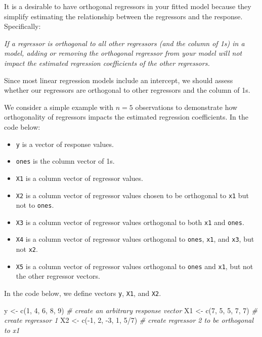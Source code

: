 \documentclass[
]{book}
\newenvironment{Shaded}{\begin{snugshade}}{\end{snugshade}}
\newcommand{\CommentTok}[1]{\textcolor[rgb]{0.56,0.35,0.01}{\textit{#1}}}
\newcommand{\DecValTok}[1]{\textcolor[rgb]{0.00,0.00,0.81}{#1}}
\newcommand{\FunctionTok}[1]{\textcolor[rgb]{0.00,0.00,0.00}{#1}}
\newcommand{\NormalTok}[1]{#1}
\newcommand{\OtherTok}[1]{\textcolor[rgb]{0.56,0.35,0.01}{#1}}
\newcommand{\SpecialCharTok}[1]{\textcolor[rgb]{0.00,0.00,0.00}{#1}}
\providecommand{\tightlist}{%
  \setlength{\itemsep}{0pt}\setlength{\parskip}{0pt}}
\theoremstyle{definition}
\theoremstyle{definition}
\theoremstyle{definition}
\theoremstyle{definition}
\theoremstyle{remark}
\begin{document}
It is a desirable to have orthogonal regressors in your fitted model
because they simplify estimating the relationship between the regressors
and the response. Specifically:

\emph{If a regressor is orthogonal to all other regressors (and the column of
1s) in a model, adding or removing the orthogonal regressor from your
model will not impact the estimated regression coefficients of the other
regressors.}

Since most linear regression models include an intercept, we should
assess whether our regressors are orthogonal to other regressors and the
column of 1s.

We consider a simple example with \(n=5\) observations to demonstrate how
orthogonality of regressors impacts the estimated regression
coefficients. In the code below:

\begin{itemize}
\tightlist
\item
  \texttt{y} is a vector of response values.
\item
  \texttt{ones} is the column vector of 1s.
\item
  \texttt{X1} is a column vector of regressor values.
\item
  \texttt{X2} is a column vector of regressor values chosen to be orthogonal
  to \texttt{x1} but not to \texttt{ones}.
\item
  \texttt{X3} is a column vector of regressor values orthogonal to both \texttt{x1}
  and \texttt{ones}.
\item
  \texttt{X4} is a column vector of regressor values orthogonal to \texttt{ones},
  \texttt{x1}, and \texttt{x3}, but not \texttt{x2}.
\item
  \texttt{X5} is a column vector of regressor values orthogonal to \texttt{ones} and
  \texttt{x1}, but not the other regressor vectors.
\end{itemize}

In the code below, we define vectors \texttt{y}, \texttt{X1}, and \texttt{X2}.

\begin{Shaded}
\begin{Highlighting}[]
\NormalTok{y }\OtherTok{\textless{}{-}} \FunctionTok{c}\NormalTok{(}\DecValTok{1}\NormalTok{, }\DecValTok{4}\NormalTok{, }\DecValTok{6}\NormalTok{, }\DecValTok{8}\NormalTok{, }\DecValTok{9}\NormalTok{)       }\CommentTok{\# create an arbitrary response vector}
\NormalTok{X1 }\OtherTok{\textless{}{-}} \FunctionTok{c}\NormalTok{(}\DecValTok{7}\NormalTok{, }\DecValTok{5}\NormalTok{, }\DecValTok{5}\NormalTok{, }\DecValTok{7}\NormalTok{, }\DecValTok{7}\NormalTok{)      }\CommentTok{\# create regressor 1}
\NormalTok{X2 }\OtherTok{\textless{}{-}} \FunctionTok{c}\NormalTok{(}\SpecialCharTok{{-}}\DecValTok{1}\NormalTok{, }\DecValTok{2}\NormalTok{, }\SpecialCharTok{{-}}\DecValTok{3}\NormalTok{, }\DecValTok{1}\NormalTok{, }\DecValTok{5}\SpecialCharTok{/}\DecValTok{7}\NormalTok{)  }\CommentTok{\# create regressor 2 to be orthogonal to x1}
\end{Highlighting}
\end{Shaded}
\end{document}
